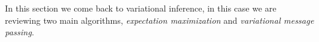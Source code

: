 
In this section we come back to variational inference, in this case we are  reviewing two main algorithms, \emph{expectation maximization} and \emph{variational message passing}.

